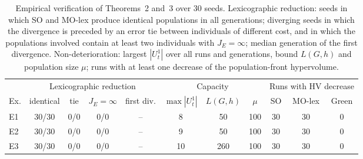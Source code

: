 \begin{table}[!htbp]
\centering
\caption{Empirical verification of Theorems~2 and~3 over 30 seeds. Lexicographic reduction: seeds in which SO and MO-lex produce identical populations in all generations; diverging seeds in which the divergence is preceded by an error tie between individuals of different cost, and in which the populations involved contain at least two individuals with $J_E=\infty$; median generation of the first divergence. Non-deterioration: largest $|U_t^1|$ over all runs and generations, bound $L(G,h)$ and population size $\mu$; runs with at least one decrease of the population-front hypervolume.}
\label{tab:checks}
\small
\setlength{\tabcolsep}{4pt}
\begin{tabular}{lcccccccccc}
\toprule
 & \multicolumn{4}{c}{Lexicographic reduction} & \multicolumn{3}{c}{Capacity} & \multicolumn{3}{c}{Runs with HV decrease} \\
\cmidrule(lr){2-5}\cmidrule(lr){6-8}\cmidrule(lr){9-11}
Ex. & identical & tie & $J_E{=}\infty$ & first div. & $\max|U_t^1|$ & $L(G,h)$ & $\mu$ & SO & MO-lex & Green \\
\midrule
E1 & 30/30 & 0/0 & 0/0 & -- & 8 & 50 & 100 & 30 & 30 & 0 \\
E2 & 30/30 & 0/0 & 0/0 & -- & 9 & 50 & 100 & 30 & 30 & 0 \\
E3 & 30/30 & 0/0 & 0/0 & -- & 10 & 260 & 100 & 30 & 30 & 0 \\
\bottomrule
\end{tabular}
\end{table}
